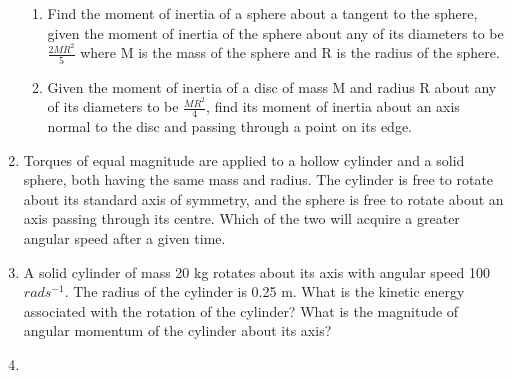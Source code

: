 \begin{enumerate}[label=\arabic*.,ref=\thesubsection.\theenumi]
\begin{enumerate}[label=(\alph*)]
\item Find the moment of inertia of a sphere about a tangent to the sphere, given the moment of inertia of the sphere about any of its diameters to be $\frac{2MR^2}{5}$ where M is the mass of the sphere and R is the radius of the sphere.
\item  Given the moment of inertia of a disc of mass M and radius R about any of its diameters to be $\frac{MR^2}{4}$, find its moment of inertia about an axis normal to the
disc and passing through a point on its edge. 
\end{enumerate}
\item Torques of equal magnitude are applied to a hollow cylinder and a solid sphere, both having the same mass and radius. The cylinder is free to rotate about its standard axis of symmetry, and the sphere is free to rotate about an axis passing through its centre. Which of the two will acquire a greater angular speed after a given time.
\item A solid cylinder of mass 20 kg rotates about its axis with angular speed 100 $rad s^{-1}$. The radius of the cylinder is 0.25 m. What is the kinetic energy associated with the rotation of the cylinder? What is the magnitude of angular momentum of the cylinder about its axis?
\item 
\begin{enumerate}[label=(\alph*)]


\end{enumerate}
\end{enumerate}
